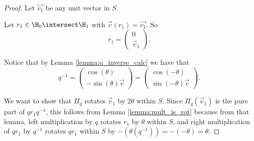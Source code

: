 \documentclass[oneside,12pt]{amsart}
\begin{document}
\begin{proof}
Let $\vec{v_1}$ be any unit vector in $S$.  

Let $r_1\in\H_0\intersect\H_1$ with
$\vec{v}(r_1)=\vec{v_1}$. So
$$r_1 = \begin{pmatrix} 0 \\ \vec{v}_1 \end{pmatrix}.$$

Notice that by Lemma \ref{lemma:q_inverse_calc} we have that
$$q^{-1} = \begin{pmatrix} \cos(\theta) \\ -\sin(\theta) \vec{v} \end{pmatrix}
= \begin{pmatrix} \cos(-\theta) \\ \sin(-\theta) \vec{v} \end{pmatrix}.$$


We want to show that $\Pi_q$ rotates $\vec{v}_1$ by $2\theta$ within $S$.
Since $\Pi_q(\vec{v}_1)$ is the pure part of $q r_1 q^{-1}$, this follows from 
Lemma \ref{lemma:mult_is_rot} because from that lemma, left multiplication by $q$
rotates $r_1$ by $\theta$ within $S$, and right multiplication of $q r_1$ by $q^{-1}$ rotates $q r_1$ within $S$ by
$-(\theta(q^{-1})) = -(-\theta) = \theta$.
\end{proof}





\end{document}
